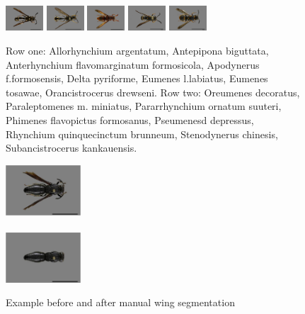 \documentclass[a4paper,12pt]{article}
\begin{document}
\begin{figure}[t]
{		\includegraphics[width=0.125\textwidth]{working16/12}
		\includegraphics[width=0.125\textwidth]{working16/13}
		\includegraphics[width=0.125\textwidth]{working16/14}
		\includegraphics[width=0.125\textwidth]{working16/15}
		\includegraphics[width=0.125\textwidth]{working16/16}
	}
	\caption{Row one: Allorhynchium argentatum, Antepipona biguttata, Anterhynchium flavomarginatum formosicola, Apodynerus f.formosensis, Delta pyriforme, Eumenes l.labiatus, Eumenes tosawae, Orancistrocerus drewseni. Row two: Oreumenes decoratus, Paraleptomenes m. miniatus, Pararrhynchium ornatum suuteri, Phimenes flavopictus formosanus, Pseumenesd depressus, Rhynchium quinquecinctum brunneum, Stenodynerus chinesis, Subancistrocerus kankauensis.}
	\label{fig:working-set}
\end{figure}

\begin{figure}
	\vspace{-30pt}

	\includegraphics[width=0.25\textwidth]{nowings/wings}
	\\\\
	\includegraphics[width=0.25\textwidth]{nowings/nowings}
	
	\caption{Example before and after manual wing segmentation}
	\label{fig:wing_seg}
\end{figure}
\end{document}
